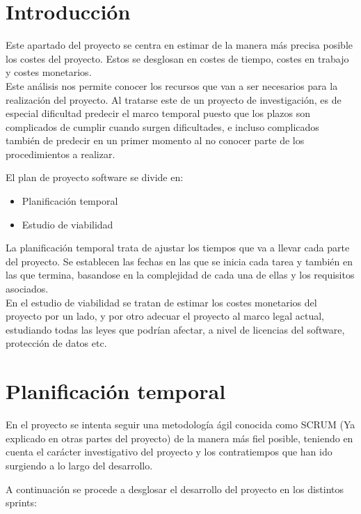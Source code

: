 	
\section{Introducción}

Este apartado del proyecto se centra en estimar de la manera más precisa posible los costes del proyecto. Estos se desglosan en costes de tiempo, costes en trabajo y costes monetarios.\\Este análisis nos permite conocer los recursos que van a ser necesarios para la realización del proyecto.
Al tratarse este de un proyecto de investigación, es de especial dificultad predecir el marco temporal puesto que los plazos son complicados de cumplir cuando surgen dificultades, e incluso complicados también de predecir en un primer momento al no conocer parte de los procedimientos a realizar.

El plan de proyecto software se divide en:
\begin{itemize}
\item Planificación temporal
\item Estudio de viabilidad
\end{itemize}

La planificación temporal trata de ajustar los tiempos que va a llevar cada parte del proyecto. Se establecen las fechas en las que se inicia cada tarea y también en las que termina, basandose en la complejidad de cada una de ellas y los requisitos asociados.
\\
 En el estudio de viabilidad se tratan de estimar los costes monetarios del proyecto por un lado, y por otro adecuar el proyecto al marco legal actual, estudiando todas las leyes que podrían afectar, a nivel de licencias del software, protección de datos etc.


\section{Planificación temporal}
 En el proyecto se intenta seguir una metodología ágil conocida como SCRUM (Ya explicado en otras partes del proyecto) de la manera más fiel posible, teniendo en cuenta el carácter investigativo del proyecto y los contratiempos que han ido surgiendo a lo largo del desarrollo.

A continuación se procede a desglosar el desarrollo del proyecto en los distintos sprints:

